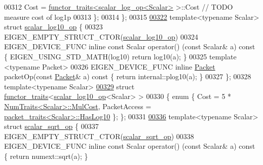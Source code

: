 \begin{DoxyCode}
00312     Cost = \hyperlink{struct_eigen_1_1internal_1_1functor__traits}{functor\_traits<scalar\_log\_op<Scalar>} >::Cost \textcolor{comment}{// TODO measure
       cost of log1p}
00313   \};
00314 \};
00315 
\hyperlink{struct_eigen_1_1internal_1_1scalar__log10__op}{00322} \textcolor{keyword}{template}<\textcolor{keyword}{typename} Scalar> \textcolor{keyword}{struct }\hyperlink{struct_eigen_1_1internal_1_1scalar__log10__op}{scalar\_log10\_op} \{
00323   EIGEN\_EMPTY\_STRUCT\_CTOR(\hyperlink{struct_eigen_1_1internal_1_1scalar__log10__op}{scalar\_log10\_op})
00324   EIGEN\_DEVICE\_FUNC \textcolor{keyword}{inline} \textcolor{keyword}{const} Scalar operator() (\textcolor{keyword}{const} Scalar& a)\textcolor{keyword}{ const }\{ EIGEN\_USING\_STD\_MATH(log10) \textcolor{keywordflow}{
      return} log10(a); \}
00325   \textcolor{keyword}{template} <\textcolor{keyword}{typename} Packet>
00326   EIGEN\_DEVICE\_FUNC \textcolor{keyword}{inline} \hyperlink{union_eigen_1_1internal_1_1_packet}{Packet} packetOp(\textcolor{keyword}{const} \hyperlink{union_eigen_1_1internal_1_1_packet}{Packet}& a)\textcolor{keyword}{ const }\{ \textcolor{keywordflow}{return} internal::plog10(a);
       \}
00327 \};
00328 \textcolor{keyword}{template}<\textcolor{keyword}{typename} Scalar>
\hyperlink{struct_eigen_1_1internal_1_1functor__traits_3_01scalar__log10__op_3_01_scalar_01_4_01_4}{00329} \textcolor{keyword}{struct }\hyperlink{struct_eigen_1_1internal_1_1functor__traits}{functor\_traits}<\hyperlink{struct_eigen_1_1internal_1_1scalar__log10__op}{scalar\_log10\_op}<Scalar> >
00330 \{ \textcolor{keyword}{enum} \{ Cost = 5 * \hyperlink{group___core___module_struct_eigen_1_1_num_traits}{NumTraits<Scalar>::MulCost}, PacketAccess = 
      \hyperlink{struct_eigen_1_1internal_1_1packet__traits}{packet\_traits<Scalar>::HasLog10} \}; \};
00331 
\hyperlink{struct_eigen_1_1internal_1_1scalar__sqrt__op}{00336} \textcolor{keyword}{template}<\textcolor{keyword}{typename} Scalar> \textcolor{keyword}{struct }\hyperlink{struct_eigen_1_1internal_1_1scalar__sqrt__op}{scalar\_sqrt\_op} \{
00337   EIGEN\_EMPTY\_STRUCT\_CTOR(\hyperlink{struct_eigen_1_1internal_1_1scalar__sqrt__op}{scalar\_sqrt\_op})
00338   EIGEN\_DEVICE\_FUNC \textcolor{keyword}{inline} \textcolor{keyword}{const} Scalar operator() (\textcolor{keyword}{const} Scalar& a)\textcolor{keyword}{ const }\{ \textcolor{keywordflow}{return} numext::sqrt(a); \}

\end{DoxyCode}
